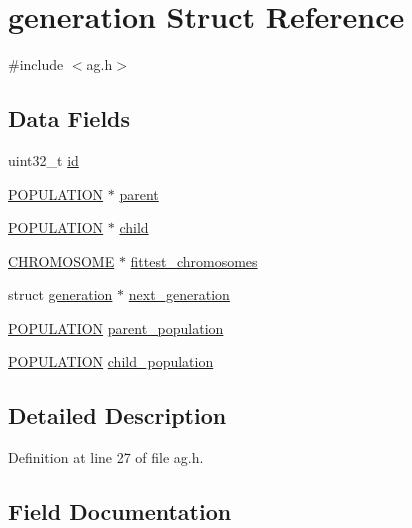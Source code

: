 \hypertarget{structgeneration}{}\section{generation Struct Reference}
\label{structgeneration}


{\ttfamily \#include $<$ag.\+h$>$}

\subsection*{Data Fields}
\begin{DoxyCompactItemize}
\item 
uint32\+\_\+t \hyperlink{structgeneration_abaabdc509cdaba7df9f56c6c76f3ae19}{id}
\item 
\hyperlink{ag_8h_a8050698e0bc2d8fb8b06ca11bcd284f3}{P\+O\+P\+U\+L\+A\+T\+I\+O\+N} $\ast$ \hyperlink{structgeneration_acd37977cdf23d81885f3ebf739c2f22b}{parent}
\item 
\hyperlink{ag_8h_a8050698e0bc2d8fb8b06ca11bcd284f3}{P\+O\+P\+U\+L\+A\+T\+I\+O\+N} $\ast$ \hyperlink{structgeneration_a4d5ee8e626a65f74dcc1bb8707bb708e}{child}
\item 
\hyperlink{ag_8h_aa412b0901c525d0ec02d820314c89bca}{C\+H\+R\+O\+M\+O\+S\+O\+M\+E} $\ast$ \hyperlink{structgeneration_af61e34a2810f247dc75359b91c94f0a1}{fittest\+\_\+chromosomes}
\item 
struct \hyperlink{structgeneration}{generation} $\ast$ \hyperlink{structgeneration_ad06847c56015bc8869688d186d511430}{next\+\_\+generation}
\item 
\hyperlink{ag_8h_a8050698e0bc2d8fb8b06ca11bcd284f3}{P\+O\+P\+U\+L\+A\+T\+I\+O\+N} \hyperlink{structgeneration_a279d4e7b5c451add6581f575ec8cbe13}{parent\+\_\+population}
\item 
\hyperlink{ag_8h_a8050698e0bc2d8fb8b06ca11bcd284f3}{P\+O\+P\+U\+L\+A\+T\+I\+O\+N} \hyperlink{structgeneration_a01e979b992227c4a9a99454e0af2a9f0}{child\+\_\+population}
\end{DoxyCompactItemize}


\subsection{Detailed Description}


Definition at line 27 of file ag.\+h.



\subsection{Field Documentation}
\hypertarget{structgeneration_a4d5ee8e626a65f74dcc1bb8707bb708e}{}
